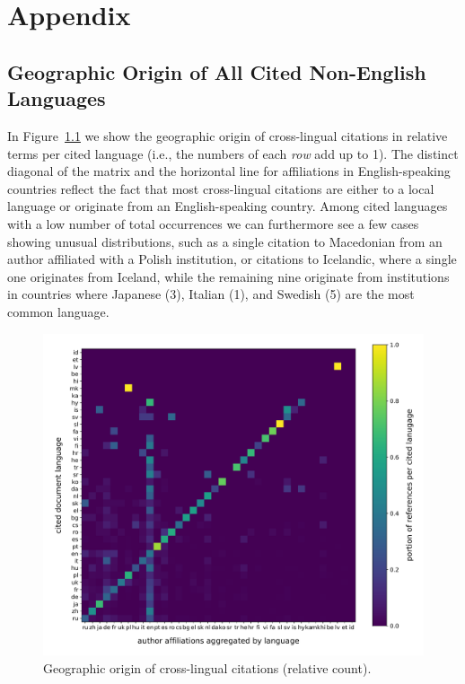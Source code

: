 \chapter{Appendix}

\section{Geographic Origin of All Cited Non-English Languages}\label{app:geo_origin}

In Figure~\ref{fig:geo_full} we show the geographic origin of cross-lingual citations in relative terms per cited language (i.e., the numbers of each \emph{row} add up to 1). The distinct diagonal of the matrix and the horizontal line for affiliations in English-speaking countries reflect the fact that most cross-lingual citations are either to a local language or originate from an English-speaking country. Among cited languages with a low number of total occurrences we can furthermore see a few cases showing unusual distributions, such as a single citation to Macedonian from an author affiliated with a Polish institution, or citations to Icelandic, where a single one originates from Iceland, while the remaining nine originate from institutions in countries where Japanese (3), Italian (1), and Swedish (5) are the most common language.

\begin{figure}[tb]
\centering
\includegraphics[width=\textwidth]{figures/ref_xling/citlang_to_author_aff_all_relative_crop.pdf}
\caption{Geographic origin of cross-lingual citations (relative count).} \label{fig:geo_full}
\end{figure}

